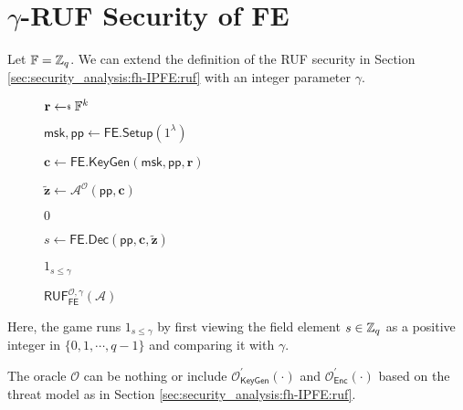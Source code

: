 
\newpage


\section{$\gamma$-RUF Security of \textsf{FE}}

Let $\mathbb{F} = \mathbb{Z}_q$. We can extend the definition of the RUF security in Section \ref{sec:security_analysis:fh-IPFE:ruf} with an integer parameter $\gamma$.

\begin{figure}[H]
\centering

	\begin{minipage}[t]{0.55\textwidth}
	\begin{algorithm}[H]
	\caption{$\textsf{RUF}^{\mathcal{O}, \gamma}_{\textsf{FE}}(\mathcal{A})$}
	\label{alg:gamma-ruf-fh-IPFE}
	\begin{algorithmic}[1]
		\State $\mathbf{r} \getsdollar \mathbb{F}^{k}$

		\State $\textsf{msk}, \textsf{pp} \gets \textsf{FE.Setup}(1^\lambda)$

		\State $\mathbf{c} \gets \textsf{FE.KeyGen}(\textsf{msk}, \textsf{pp}, \mathbf{r})$

		\State $\mathbf{\tilde{z}} \gets \mathcal{A}^{\mathcal{O}} ( \textsf{pp}, \mathbf{c} )$

			
			\State \Return $0$
		
		\EndIf

		\State $s \gets \textsf{FE.Dec}(\textsf{pp}, \mathbf{c}, \mathbf{\tilde{z}} )$

		\State \Return $1_{s \leq \gamma}$
	\end{algorithmic}
	\end{algorithm}
	\end{minipage}

\end{figure}

Here, the game runs $1_{s \leq \gamma}$ by first viewing the field element $s \in \mathbb{Z}_q$ as a positive integer in $\{0, 1, \cdots, q-1 \}$ and comparing it with $\gamma$.

The oracle $\mathcal{O}$ can be nothing or include $\mathcal{O}^\prime_{\textsf{KeyGen}}(\cdot)$ and $\mathcal{O}^\prime_{\textsf{Enc}}(\cdot)$ based on the threat model as in Section \ref{sec:security_analysis:fh-IPFE:ruf}.

